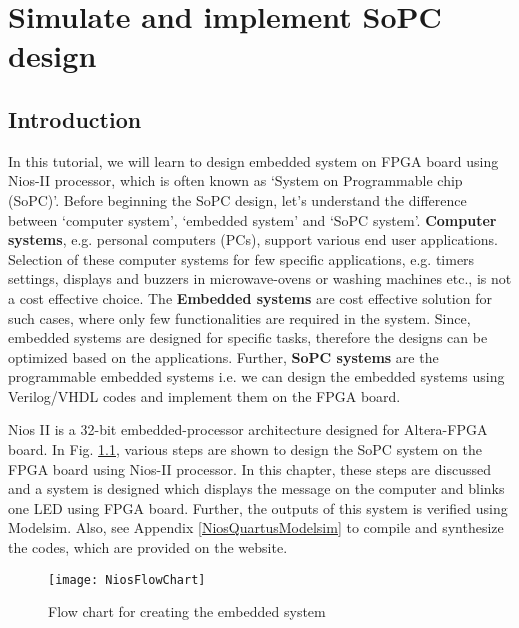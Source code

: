 \chapter{Simulate and implement SoPC design} \label{ch:NiosOverview}

\graphicspath{{Chapters/NiosOverview/Figures/}}


\section{Introduction}
In this tutorial, we will learn to design embedded system on FPGA board using Nios-II processor, which is often known as `System on Programmable chip (SoPC)'. Before beginning the SoPC design, let's understand the difference between `computer system', `embedded system' and `SoPC system'. \textbf{Computer systems}, e.g. personal computers (PCs), support various end user applications. Selection of these computer systems for few specific applications, e.g. timers settings, displays and buzzers in microwave-ovens or washing machines etc.,  is not a cost effective choice. The \textbf{Embedded systems} are cost effective solution for such cases, where only few functionalities are required in the system.  Since, embedded systems are designed for specific tasks, therefore the designs can be optimized based on the applications. Further, \textbf{SoPC systems} are the programmable embedded systems i.e. we can design the embedded systems using Verilog/VHDL codes and implement them on the FPGA board.

Nios II is a 32-bit embedded-processor architecture designed for Altera-FPGA board. In Fig. \ref{fig:NiosFlowChart}, various steps are shown to design the SoPC system on the FPGA board using Nios-II processor. In this chapter, these steps are discussed and a system is designed which displays the message on the computer and blinks one LED using FPGA board. Further, the outputs of this system is verified using Modelsim.  Also, see Appendix \ref{NiosQuartusModelsim} to compile and synthesize the codes, which are provided on the website.

\begin{figure}[!h]
	\centering
	\texttt{[image: NiosFlowChart]}
	\caption{Flow chart for creating the embedded system}
	\label{fig:NiosFlowChart}
\end{figure}

